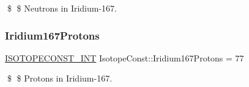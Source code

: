 \$ \$ Neutrons in Iridium-\/167. \mbox{\label{group___isotope_const-_iridium-_ir167_ga60fca4f8546d112d92aa2f0d638e2747}} 
\subsubsection{\texorpdfstring{Iridium167\+Protons}{Iridium167Protons}}
{\footnotesize\ttfamily \mbox{\hyperlink{group___isotope_const-_macros_ga5f18360b3e99483a35c32d789e62621c}{I\+S\+O\+T\+O\+P\+E\+C\+O\+N\+S\+T\+\_\+\+I\+NT}} Isotope\+Const\+::\+Iridium167\+Protons = 77}

\$ \$ Protons in Iridium-\/167. 